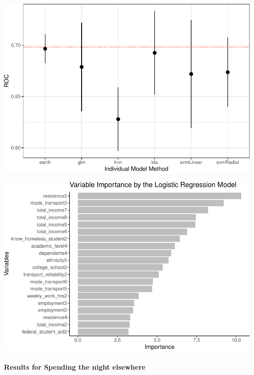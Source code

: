 \documentclass[
  10pt,
]{article}
\begin{document}
\begin{center}\includegraphics{phase2_report_files/figure-latex/unnamed-chunk-10-1} \end{center}

\begin{center}\includegraphics{phase2_report_files/figure-latex/unnamed-chunk-11-1} \end{center}

\hypertarget{results-for-spending-the-night-elsewhere}{%
\paragraph{Results for Spending the night elsewhere}\label{results-for-spending-the-night-elsewhere}}
\end{document}
